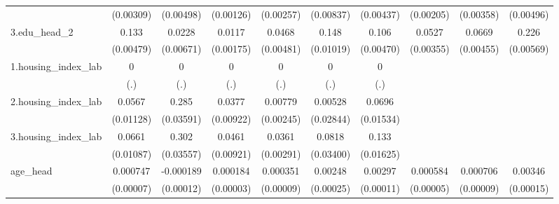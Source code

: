 \begin{table}[htbp]
\begin{tabular}{l*{9}{c}}
            &   (0.00309)         &   (0.00498)         &   (0.00126)         &   (0.00257)         &   (0.00837)         &   (0.00437)         &   (0.00205)         &   (0.00358)         &   (0.00496)         \\
3.edu\_head\_2&       0.133\sym{***}&      0.0228\sym{***}&      0.0117\sym{***}&      0.0468\sym{***}&       0.148\sym{***}&       0.106\sym{***}&      0.0527\sym{***}&      0.0669\sym{***}&       0.226\sym{***}\\
            &   (0.00479)         &   (0.00671)         &   (0.00175)         &   (0.00481)         &   (0.01019)         &   (0.00470)         &   (0.00355)         &   (0.00455)         &   (0.00569)         \\
1.housing\_index\_lab&           0         &           0         &           0         &           0         &           0         &           0         &                     &                     &                     \\
            &         (.)         &         (.)         &         (.)         &         (.)         &         (.)         &         (.)         &                     &                     &                     \\
2.housing\_index\_lab&      0.0567\sym{***}&       0.285\sym{***}&      0.0377\sym{***}&     0.00779\sym{***}&     0.00528         &      0.0696\sym{***}&                     &                     &                     \\
            &   (0.01128)         &   (0.03591)         &   (0.00922)         &   (0.00245)         &   (0.02844)         &   (0.01534)         &                     &                     &                     \\
3.housing\_index\_lab&      0.0661\sym{***}&       0.302\sym{***}&      0.0461\sym{***}&      0.0361\sym{***}&      0.0818\sym{**} &       0.133\sym{***}&                     &                     &                     \\
            &   (0.01087)         &   (0.03557)         &   (0.00921)         &   (0.00291)         &   (0.03400)         &   (0.01625)         &                     &                     &                     \\
age\_head    &    0.000747\sym{***}&   -0.000189         &    0.000184\sym{***}&    0.000351\sym{***}&     0.00248\sym{***}&     0.00297\sym{***}&    0.000584\sym{***}&    0.000706\sym{***}&     0.00346\sym{***}\\
            &   (0.00007)         &   (0.00012)         &   (0.00003)         &   (0.00009)         &   (0.00025)         &   (0.00011)         &   (0.00005)         &   (0.00009)         &   (0.00015)         \\

\end{tabular}
\end{table}
